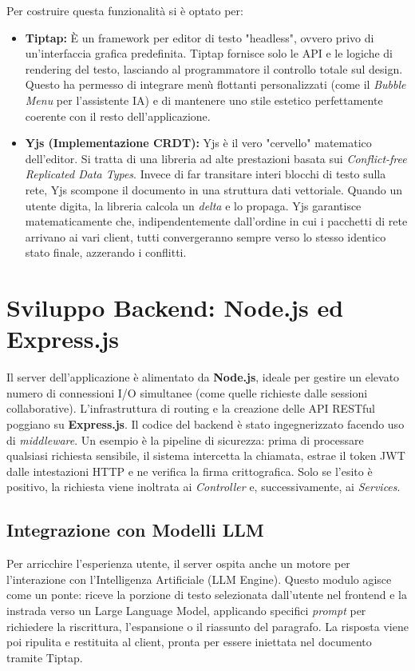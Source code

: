 \documentclass[11pt,a4paper]{report}
\begin{document}
Per costruire questa funzionalità si è optato per:
\begin{itemize}
    \item \textbf{Tiptap:} È un framework per editor di testo "headless", ovvero privo di un'interfaccia grafica predefinita. Tiptap fornisce solo le API e le logiche di rendering del testo, lasciando al programmatore il controllo totale sul design. Questo ha permesso di integrare menù flottanti personalizzati (come il \textit{Bubble Menu} per l'assistente IA) e di mantenere uno stile estetico perfettamente coerente con il resto dell'applicazione.
    \item \textbf{Yjs (Implementazione CRDT):} Yjs è il vero "cervello" matematico dell'editor. Si tratta di una libreria ad alte prestazioni basata sui \textit{Conflict-free Replicated Data Types}. Invece di far transitare interi blocchi di testo sulla rete, Yjs scompone il documento in una struttura dati vettoriale. Quando un utente digita, la libreria calcola un \textit{delta} e lo propaga. Yjs garantisce matematicamente che, indipendentemente dall'ordine in cui i pacchetti di rete arrivano ai vari client, tutti convergeranno sempre verso lo stesso identico stato finale, azzerando i conflitti.
\end{itemize}

\section{Sviluppo Backend: Node.js ed Express.js}
Il server dell'applicazione è alimentato da \textbf{Node.js}, ideale per gestire un elevato numero di connessioni I/O simultanee (come quelle richieste dalle sessioni collaborative). 
L'infrastruttura di routing e la creazione delle API RESTful poggiano su \textbf{Express.js}. Il codice del backend è stato ingegnerizzato facendo uso di \textit{middleware}. Un esempio è la pipeline di sicurezza: prima di processare qualsiasi richiesta sensibile, il sistema intercetta la chiamata, estrae il token JWT dalle intestazioni HTTP e ne verifica la firma crittografica. Solo se l'esito è positivo, la richiesta viene inoltrata ai \textit{Controller} e, successivamente, ai \textit{Services}.

\subsection{Integrazione con Modelli LLM}
Per arricchire l'esperienza utente, il server ospita anche un motore per l'interazione con l'Intelligenza Artificiale (LLM Engine). Questo modulo agisce come un ponte: riceve la porzione di testo selezionata dall'utente nel frontend e la instrada verso un Large Language Model, applicando specifici \textit{prompt} per richiedere la riscrittura, l'espansione o il riassunto del paragrafo. La risposta viene poi ripulita e restituita al client, pronta per essere iniettata nel documento tramite Tiptap.
\end{document}
